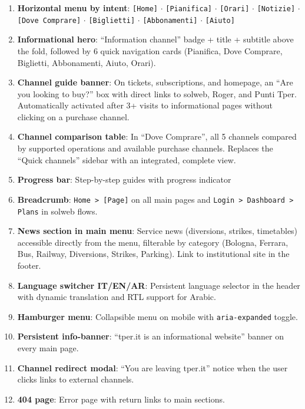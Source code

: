 ﻿\documentclass[11pt,a4paper]{article}
\begin{document}
\begin{tcolorbox}[rffield]
\small
\begin{enumerate}[nosep,leftmargin=*]
  \item \textbf{Horizontal menu by intent}: \texttt{[Home]} $\cdot$ \texttt{[Pianifica]} $\cdot$ \texttt{[Orari]} $\cdot$ \texttt{[Notizie]} $\cdot$ \texttt{[Dove Comprare]} $\cdot$ \texttt{[Biglietti]} $\cdot$ \texttt{[Abbonamenti]} $\cdot$ \texttt{[Aiuto]}
  \item \textbf{Informational hero}: ``Information channel'' badge + title + subtitle above the fold, followed by 6 quick navigation cards (Pianifica, Dove Comprare, Biglietti, Abbonamenti, Aiuto, Orari).
  \item \textbf{Channel guide banner}: On tickets, subscriptions, and homepage, an ``Are you looking to buy?'' box with direct links to solweb, Roger, and Punti Tper. Automatically activated after 3+ visits to informational pages without clicking on a purchase channel.
  \item \textbf{Channel comparison table}: In ``Dove Comprare'', all 5 channels compared by supported operations and available purchase channels. Replaces the ``Quick channels'' sidebar with an integrated, complete view.
  \item \textbf{Progress bar}: Step-by-step guides with progress indicator
  \item \textbf{Breadcrumb}: \texttt{Home > [Page]} on all main pages and \texttt{Login > Dashboard > Plans} in solweb flows.
  \item \textbf{News section in main menu}: Service news (diversions, strikes, timetables) accessible directly from the menu, filterable by category (Bologna, Ferrara, Bus, Railway, Diversions, Strikes, Parking). Link to institutional site in the footer.
  \item \textbf{Language switcher IT/EN/AR}: Persistent language selector in the header with dynamic translation and RTL support for Arabic.
  \item \textbf{Hamburger menu}: Collapsible menu on mobile with \texttt{aria-expanded} toggle.
  \item \textbf{Persistent info-banner}: ``tper.it is an informational website'' banner on every main page.
  \item \textbf{Channel redirect modal}: ``You are leaving tper.it'' notice when the user clicks links to external channels.
  \item \textbf{404 page}: Error page with return links to main sections.
\end{enumerate}
\end{tcolorbox}
\end{document}
